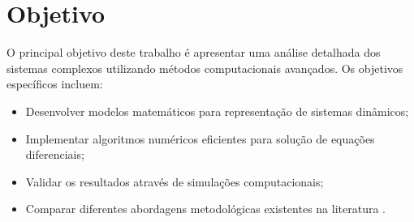 \section{Objetivo}

\lipsum[4] O principal objetivo deste trabalho é apresentar uma análise detalhada dos sistemas complexos utilizando métodos computacionais avançados. Os objetivos específicos incluem:

\begin{itemize}
    \item Desenvolver modelos matemáticos para representação de sistemas dinâmicos;
    \item Implementar algoritmos numéricos eficientes para solução de equações diferenciais;
    \item Validar os resultados através de simulações computacionais;
    \item Comparar diferentes abordagens metodológicas existentes na literatura \cite{kumar2024, wang2023}.
\end{itemize}
